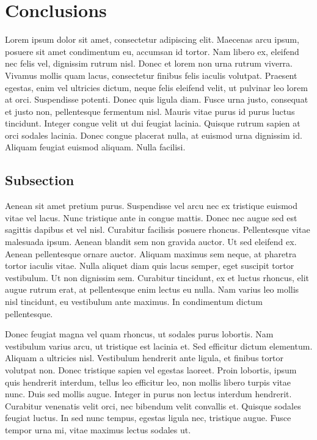 
\chapter*{Conclusions}
\label{intro}

Lorem ipsum dolor sit amet, consectetur adipiscing elit. Maecenas arcu ipsum, posuere sit amet condimentum eu, accumsan id tortor. Nam libero ex, eleifend nec felis vel, dignissim rutrum nisl. Donec et lorem non urna rutrum viverra. Vivamus mollis quam lacus, consectetur finibus felis iaculis volutpat. Praesent egestas, enim vel ultricies dictum, neque felis eleifend velit, ut pulvinar leo lorem at orci. Suspendisse potenti. Donec quis ligula diam. Fusce urna justo, consequat et justo non, pellentesque fermentum nisl. Mauris vitae purus id purus luctus tincidunt. Integer congue velit ut dui feugiat lacinia. Quisque rutrum sapien at orci sodales lacinia. Donec congue placerat nulla, at euismod urna dignissim id. Aliquam feugiat euismod aliquam. Nulla facilisi.

\section*{Subsection}
Aenean sit amet pretium purus. Suspendisse vel arcu nec ex tristique euismod vitae vel lacus. Nunc tristique ante in congue mattis. Donec nec augue sed est sagittis dapibus et vel nisl. Curabitur facilisis posuere rhoncus. Pellentesque vitae malesuada ipsum. Aenean blandit sem non gravida auctor. Ut sed eleifend ex. Aenean pellentesque ornare auctor. Aliquam maximus sem neque, at pharetra tortor iaculis vitae. Nulla aliquet diam quis lacus semper, eget suscipit tortor vestibulum. Ut non dignissim sem. Curabitur tincidunt, ex et luctus rhoncus, elit augue rutrum erat, at pellentesque enim lectus eu nulla. Nam varius leo mollis nisl tincidunt, eu vestibulum ante maximus. In condimentum dictum pellentesque.

Donec feugiat magna vel quam rhoncus, ut sodales purus lobortis. Nam vestibulum varius arcu, ut tristique est lacinia et. Sed efficitur dictum elementum. Aliquam a ultricies nisl. Vestibulum hendrerit ante ligula, et finibus tortor volutpat non. Donec tristique sapien vel egestas laoreet. Proin lobortis, ipsum quis hendrerit interdum, tellus leo efficitur leo, non mollis libero turpis vitae nunc. Duis sed mollis augue. Integer in purus non lectus interdum hendrerit. Curabitur venenatis velit orci, nec bibendum velit convallis et. Quisque sodales feugiat luctus. In sed nunc tempus, egestas ligula nec, tristique augue. Fusce tempor urna mi, vitae maximus lectus sodales ut.

